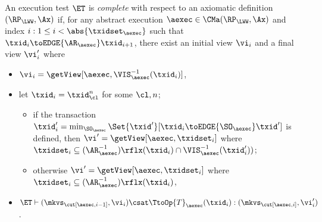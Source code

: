 \begin{definition}
\label{def:et_complete}
An execution test $\ET$ is \emph{complete} with respect 
to an axiomatic definition $(\RP_{\LWW}, \Ax)$ if, for any abstract execution $\aexec \in \CMa(\RP_{\LWW}, \Ax)$ 
and index \( i : 1 \leq i < \abs{\txidset_{\aexec}}\) such that \( \txid_{i} \toEDGE{\AR_{\aexec}} \txid_{i+1} \), there exist an initial view $\vi_{i}$ and a final view $\vi_{i}'$ where 
\begin{itemize}
\item $\vi_{i} = \getView[\aexec, \VIS_{\aexec}^{-1}(\txid_{i})]$, 
\item let $\txid_{i} = \txid_{\cl}^{n}$ for some $\cl, n$; 
    \begin{itemize}
        \item if the transaction $\txid_{i}' = \min_{\SO_{\aexec}}\Set{\txid' }[ \txid_i \toEDGE{\SO_{\aexec}} \txid']$ is defined, then $\vi' = \getView[\aexec, \txidset_{i}]$ where $\txidset_{i} \subseteq (\AR_{\aexec}^{-1})\rflx(\txid_{i}) \cap \VIS_{\aexec}^{-1}(\txid_{i}'))$; 
        \item otherwise $\vi' = \getView[\aexec, \txidset_{i}]$ where $\txidset_{i} \subseteq (\AR_{\aexec}^{-1})\rflx(\txid_{i})$, 
    \end{itemize}
\item $\ET \vdash (\mkvs_{\cut[\aexec, i-1]}, \vi_{i}) \csat \TtoOp{T}_{\aexec}(\txid_{i}) : (\mkvs_{\cut[\aexec, i]},\vi_{i}')$.
\end{itemize}
\end{definition}

